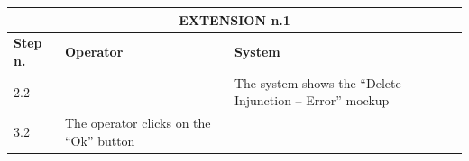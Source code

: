 {{{\begin{center}
			\begin{tabular}{|p{2cm}|p{6cm}|p{6cm}|}
			\hline
				\multicolumn{3}{|c|}{EXTENSION n.1}\\
			\hline
				\centering \vspace{1mm} \bfseries{Step n.} \vspace{1mm} & \vspace{1mm} \bfseries{Operator} \vspace{1mm} & \vspace{1mm} \bfseries{System} \vspace{1mm}\\
			\hline
				\vspace{1mm} 2.2\vspace{1mm} &
				\vspace{1mm} \vspace{1mm} & 
				\vspace{1mm} The system shows the “Delete Injunction – Error” mockup\vspace{1mm} \\
			\hline
				\vspace{1mm} 3.2\vspace{1mm} &
				\vspace{1mm} The operator clicks on the “Ok”  button\vspace{1mm} & 
				\vspace{1mm} \vspace{1mm} \\
			\hline
			\end{tabular}
			\end{center}
			
			\clearpage

}}}

